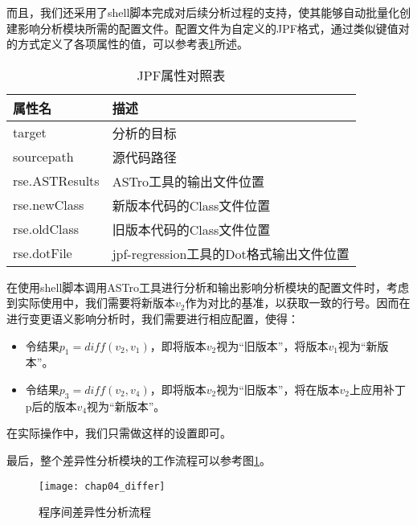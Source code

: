 而且，我们还采用了shell脚本完成对后续分析过程的支持，使其能够自动批量化创建影响分析模块所需的配置文件。配置文件为自定义的JPF格式，通过类似键值对的方式定义了各项属性的值，可以参考表\ref {JPF_prop}所述。

\begin{table}
	\caption{JPF属性对照表}
	\label{JPF_prop}
	\centering
	\begin{tabular*}{\linewidth}{lp{10cm}}
		\toprule[1.5pt]
		{\heiti 属性名} & {\heiti 描述} \\\midrule[1pt]
		target & 分析的目标 \\
		sourcepath & 源代码路径\\
		rse.ASTResults & ASTro工具的输出文件位置\\
		rse.newClass & 新版本代码的Class文件位置\\
		rse.oldClass    & 旧版本代码的Class文件位置\\
		rse.dotFile   & jpf-regression工具的Dot格式输出文件位置\\
		\bottomrule[1.5pt]
	\end{tabular*}
\end{table}

在使用shell脚本调用ASTro工具进行分析和输出影响分析模块的配置文件时，考虑到实际使用中，我们需要将新版本$v_2$作为对比的基准，以获取一致的行号。因而在进行变更语义影响分析时，我们需要进行相应配置，使得：
\begin{itemize}
	\item 令结果$p_1 = diff(v_2,v_1)$，即将版本$v_2$视为“旧版本”，将版本$v_1$视为“新版本”。
	\item 令结果$p_3 = diff(v_2,v_4)$，即将版本$v_2$视为“旧版本”，将在版本$v_2$上应用补丁p后的版本$v_4$视为“新版本”。
\end{itemize}

在实际操作中，我们只需做这样的设置即可。

最后，整个差异性分析模块的工作流程可以参考图\ref {diff}。

\begin{figure}[H]
	\centering
	\texttt{[image: chap04\_differ]}
	\caption {程序间差异性分析流程}
	\label {diff}	
\end{figure}



